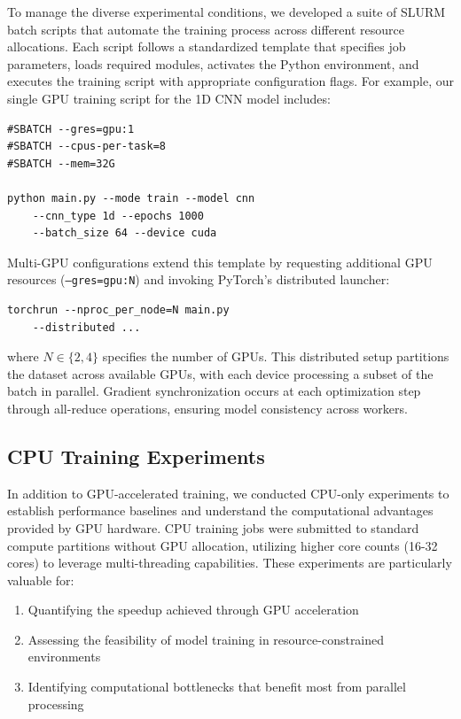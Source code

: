 \documentclass[sigconf]{acmart}
\begin{document}
To manage the diverse experimental conditions, we developed a suite of SLURM batch scripts that automate the training process across different resource allocations. Each script follows a standardized template that specifies job parameters, loads required modules, activates the Python environment, and executes the training script with appropriate configuration flags. For example, our single GPU training script for the 1D CNN model includes:

\begin{verbatim}
#SBATCH --gres=gpu:1
#SBATCH --cpus-per-task=8
#SBATCH --mem=32G

python main.py --mode train --model cnn 
    --cnn_type 1d --epochs 1000 
    --batch_size 64 --device cuda
\end{verbatim}

Multi-GPU configurations extend this template by requesting additional GPU resources (\texttt{--gres=gpu:N}) and invoking PyTorch's distributed launcher:

\begin{verbatim}
torchrun --nproc_per_node=N main.py 
    --distributed ...
\end{verbatim}

where $N \in \{2, 4\}$ specifies the number of GPUs. This distributed setup partitions the dataset across available GPUs, with each device processing a subset of the batch in parallel. Gradient synchronization occurs at each optimization step through all-reduce operations, ensuring model consistency across workers.

\subsection{CPU Training Experiments}

In addition to GPU-accelerated training, we conducted CPU-only experiments to establish performance baselines and understand the computational advantages provided by GPU hardware. CPU training jobs were submitted to standard compute partitions without GPU allocation, utilizing higher core counts (16-32 cores) to leverage multi-threading capabilities. These experiments are particularly valuable for:

\begin{enumerate}
  \item Quantifying the speedup achieved through GPU acceleration
  \item Assessing the feasibility of model training in resource-constrained environments
  \item Identifying computational bottlenecks that benefit most from parallel processing
\end{enumerate}
\end{document}
